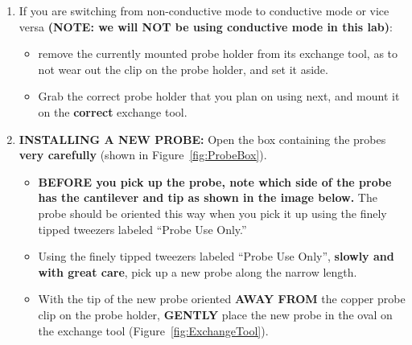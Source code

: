 \documentclass{../lab}
\begin{document}
\begin{enumerate}
    \item If you are switching from non-conductive mode to conductive mode or vice versa \textbf{(NOTE: we will NOT be using conductive mode in this lab)}:
    \begin{itemize}
        \item remove the currently mounted probe holder from its exchange tool, as to not wear out the clip on the probe holder, and set it aside.

        \item Grab the correct probe holder that you plan on using next, and mount it on the \textbf{correct} exchange tool.
    \end{itemize}
    
    \item \textbf{INSTALLING A NEW PROBE:}  Open the box containing the probes \textbf{very carefully} (shown in Figure~\ref{fig:ProbeBox}).
    
    \begin{itemize}
        \item \textbf{BEFORE you pick up the probe, note which side of the probe has the cantilever and tip as shown in the image below.}  The probe should be oriented this way when you pick it up using the finely tipped tweezers labeled ``Probe Use Only.''

        \item Using the finely tipped tweezers labeled ``Probe Use Only'', \textbf{slowly and with great care}, pick up a new probe along the narrow length.
    
        \item With the tip of the new probe oriented \textbf{AWAY FROM} the copper probe clip on the probe holder, \textbf{GENTLY} place the new probe in the oval on the exchange tool (Figure~\ref{fig:ExchangeTool}).
    \end{itemize}
    

\end{enumerate}
\end{document}
